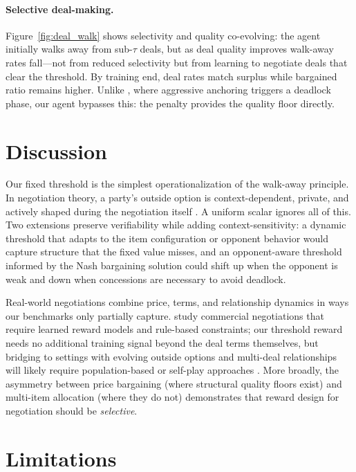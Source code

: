 \documentclass[11pt]{article}
\begin{document}
\paragraph{Selective deal-making.}
Figure~\ref{fig:deal_walk} shows selectivity and quality co-evolving: the agent initially walks away from sub-$\tau$ deals, but as deal quality improves walk-away rates fall---not from reduced selectivity but from learning to negotiate deals that clear the threshold. By training end, deal rates match surplus while bargained ratio remains higher. Unlike \citet{liu2026instructing}, where aggressive anchoring triggers a deadlock phase, our agent bypasses this: the penalty provides the quality floor directly.

\section{Discussion}

Our fixed threshold is the simplest operationalization of the walk-away principle. In negotiation theory, a party's outside option is context-dependent, private, and actively shaped during the negotiation itself \citep{fisher1981gettingtoyes, raiffa1982art}. A uniform scalar ignores all of this. Two extensions preserve verifiability while adding context-sensitivity: a dynamic threshold that adapts to the item configuration or opponent behavior would capture structure that the fixed value misses, and an opponent-aware threshold informed by the Nash bargaining solution \citep{nash1950bargaining} could shift up when the opponent is weak and down when concessions are necessary to avoid deadlock.

Real-world negotiations combine price, terms, and relationship dynamics in ways our benchmarks only partially capture. \citet{zeng2025repo} study commercial negotiations that require learned reward models and rule-based constraints; our threshold reward needs no additional training signal beyond the deal terms themselves, but bridging to settings with evolving outside options and multi-deal relationships will likely require population-based or self-play approaches \citep{liu2025spiral}. More broadly, the asymmetry between price bargaining (where structural quality floors exist) and multi-item allocation (where they do not) demonstrates that reward design for negotiation should be \textit{selective}.

\section*{Limitations}
\end{document}

